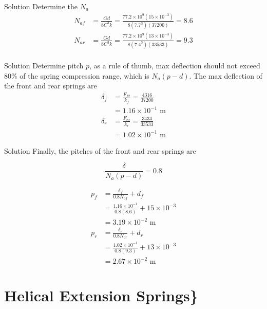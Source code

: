 \documentclass[10pt, svgnames]{beamer}
\begin{document}
\begin{frame}[label={sec:orged25010}]{Solution}
Determine the \(N_a\)
\begin{align*}
  {N_{af}} &= \frac{{Gd}}{{8{C^3}k}} = \frac{{77.2 \times {{10}^9}(15 \times {{10}^{ - 3}})}}{{8({{7.7}^3})(37200)}} = 8.6 \\
  {N_{ar}} &= \frac{{Gd}}{{8{C^3}k}} = \frac{{77.2 \times {{10}^9}(13 \times {{10}^{ - 3}})}}{{8({{7.4}^3})(33533)}} = 9.3 \\
\end{align*}
\end{frame}

\begin{frame}[label={sec:org28d7abc}]{Solution}
Determine pitch \(p\), as a rule of thumb, max deflection should not exceed 80\% of the spring compression range, which is \(N_a(p - d)\). The max deflection of the front and rear springs are
\begin{align*}
  \delta_f &= \frac{F_{f2}}{k_f} = \frac{4316}{37200} \\
           &= 1.16 \times 10^{-1} \text{ m} \\
  \delta_r &= \frac{F_{r2}}{k_r} = \frac{3434}{33533} \\
           &= 1.02 \times 10^{-1} \text{ m}
\end{align*}
\end{frame}

\begin{frame}[label={sec:orgf8440da}]{Solution}
Finally, the pitches of the front and rear springs are

\[\frac{\delta }{{{N_a}(p - d)}} = 0.8\]

\begin{align*}
  {p_f} &= \frac{\delta_f}{0.8 N_{af}} + {d_f} \\ 
        &= \frac{{1.16 \times {{10}^{ - 1}}}}{{0.8(8.6)}} + 15 \times {10^{ - 3}} \\ 
        &= 3.19 \times 10^{-2} \text{ m} \\
  {p_r} &= \frac{\delta_r}{0.8N_{ar}} + d_r \\ 
        &= \frac{1.02 \times 10^{-1}}{0.8(9.3)} + 13 \times 10^{-3} \\ 
        &= 2.67 \times {10^{ - 2}} \text{ m}
\end{align*}
\end{frame}

\section{Helical Extension Springs\}}
\label{sec:orga507437}
\end{document}
